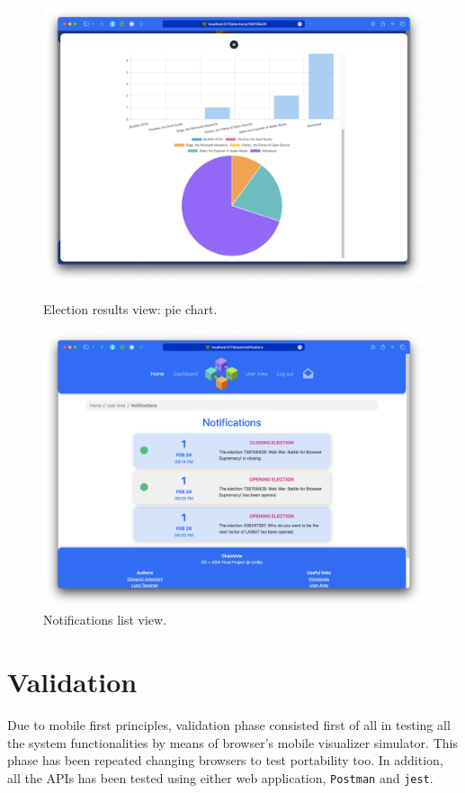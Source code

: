 \documentclass{scrartcl}
\begin{document}
\begin{figure}
    \centering
    \includegraphics[width=0.9\linewidth]{figures/story-board/14-results.png}
    \label{fig:results-2}
    \caption{Election results view: pie chart.}
\end{figure}

\begin{figure}
    \centering
    \includegraphics[width=0.9\linewidth]{figures/story-board/15-notifications.png}
    \caption{Notifications list view.}
    \label{fig:notifications-list}
\end{figure}
\restoregeometry

\section{Validation}

Due to mobile first principles, validation phase consisted first of all in testing all the system functionalities by means of browser's mobile visualizer simulator.
This phase has been repeated changing browsers to test portability too. In addition, all the APIs has been tested using either web application, \texttt{Postman} and \texttt{jest}.
\end{document}
